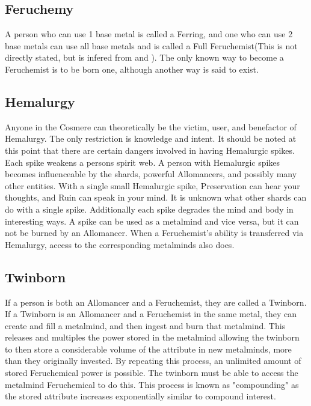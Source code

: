 \documentclass[conference]{IEEEtran}
\begin{document}
\subsection*{Feruchemy}
A person who can use 1 base metal is called a Ferring,\cite{Ferring-name} and one who can use 2 base metals can use all base metals and is called a Full Feruchemist(This is not directly stated, but is infered from\cite{AoL-CH1} and \cite{TFE-CH3}).  The only known way to become a Feruchemist is to be born one,\cite{TFE-CH22} although another way is said to exist.\cite{other-FE}

\subsection*{Hemalurgy}
Anyone in the Cosmere can theoretically be the victim, user, and benefactor of Hemalurgy.\cite{HE-hopper}   The only restriction is knowledge and intent.
It should be noted at this point that there are certain dangers involved in having Hemalurgic spikes.  Each spike weakens a persons spirit web.  A person with Hemalurgic spikes becomes influenceable  by the shards, powerful Allomancers, and possibly many other entities.\cite{HE-Shard}\cite{HoA-CH58}\cite{HoA-CH13}\cite{HoA-CH77}
With a single small Hemalurgic spike, Preservation can hear your thoughts,\cite{SoS-CH7} and Ruin can speak in your mind.\cite{HoA-CH65}  It is unknown what other shards can do with a single spike.
Additionally each spike degrades the mind and body in interesting ways.\cite{WoF}  
A spike can be used as a metalmind and vice versa,\cite{HE-Fe-Mind} but it can not be burned by an Allomancer.\cite{HE-Al-burn}
When a Feruchemist's ability is transferred via Hemalurgy, access to the corresponding metalminds also does.\cite{HE-Fe-access}
\subsection*{Twinborn}
If a person is both an Allomancer and a Feruchemist, they are called a Twinborn.\cite{AoL-CH1}    
If a Twinborn is an Allomancer and a Feruchemist in the same metal, they can create and fill a metalmind, and then ingest and burn that metalmind.  This releases and multiples the power stored in the metalmind allowing the twinborn to then store a considerable volume of the attribute in new metalminds, more than they originally invested.  By repeating this process, an unlimited amount of stored Feruchemical power is possible.\cite{AoL-CH11}  The twinborn must be able to access the metalmind Feruchemical to do this.\cite{TFE-CH29}  This process is known as "compounding" as the stored attribute increases exponentially similar to compound interest.\cite{AoL-CH11}
\end{document}
